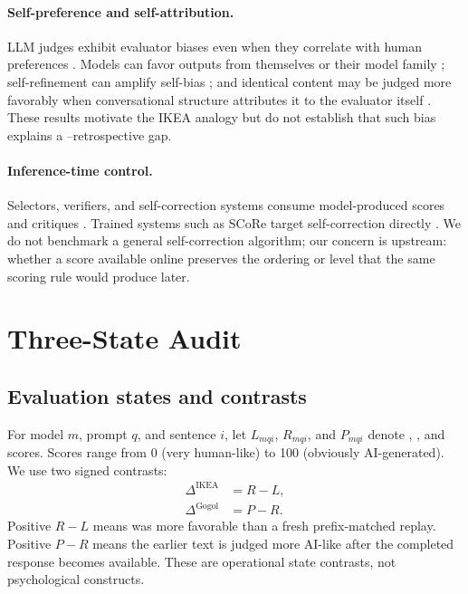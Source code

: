 \paragraph{Self-preference and self-attribution.}
LLM judges exhibit evaluator biases even when they correlate with human preferences \citep{zheng2023judge,wang2024fair}. Models can favor outputs from themselves or their model family \citep{liu2024narcissistic,panickssery2024recognize,wataoka2024selfpreference}; self-refinement can amplify self-bias \citep{xu2024pride}; and identical content may be judged more favorably when conversational structure attributes it to the evaluator itself \citep{khullar2026selfattribution,sanzguerrero2026ownership}. These results motivate the IKEA analogy but do not establish that such bias explains a \live{}--retrospective gap.

\paragraph{Inference-time control.}
Selectors, verifiers, and self-correction systems consume model-produced scores and critiques \citep{wang2023selfconsistency,lightman2023verify,snell2024testtime}. Trained systems such as SCoRe target self-correction directly \citep{kumar2025score}. We do not benchmark a general self-correction algorithm; our concern is upstream: whether a score available online preserves the ordering or level that the same scoring rule would produce later.

\section{Three-State Audit}
\subsection{Evaluation states and contrasts}
For model $m$, prompt $q$, and sentence $i$, let $L_{mqi}$, $R_{mqi}$, and $P_{mqi}$ denote \live{}, \replay{}, and \post{} scores. Scores range from 0 (very human-like) to 100 (obviously AI-generated). We use two signed contrasts:
\begin{align}
\Delta^{\mathrm{IKEA}} &= R-L,\\
\Delta^{\mathrm{Gogol}} &= P-R.
\end{align}
Positive $R-L$ means \live{} was more favorable than a fresh prefix-matched replay. Positive $P-R$ means the earlier text is judged more AI-like after the completed response becomes available. These are operational state contrasts, not psychological constructs.

